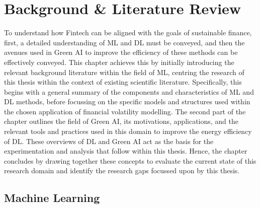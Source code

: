\documentclass[a4paper, 11pt]{report}
\begin{document}
    \newpage
    \chapter{Background \& Literature Review}
    \label{chapter: literature}

    To understand how Fintech can be aligned with the goals of sustainable finance, first, a detailed understanding of ML and DL must be conveyed, and then the avenues used in Green AI to improve the efficiency of these methods can be effectively conveyed. This chapter achieves this by initially introducing the relevant background literature within the field of ML, centring the research of this thesis within the context of existing scientific literature. Specifically, this begins with a general summary of the components and characteristics of ML and DL methods, before focussing on the specific models and structures used within the chosen application of financial volatility modelling. The second part of the chapter outlines the field of Green AI, its motivations, applications, and the relevant tools and practices used in this domain to improve the energy efficiency of DL. These overviews of DL and Green AI act as the basis for the experimentation and analysis that follow within this thesis. Hence, the chapter concludes by drawing together these concepts to evaluate the current state of this research domain and identify the research gaps focussed upon by this thesis.


    \section{Machine Learning}
\end{document}
